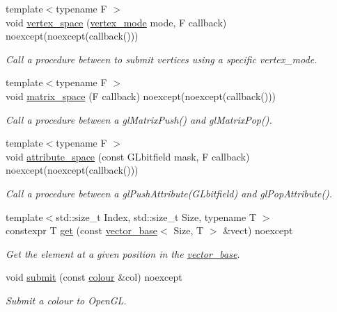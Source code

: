 \begin{DoxyCompactItemize}
{\footnotesize template$<$typename F $>$ }\\void \hyperlink{namespaceglpp_aa7cbd5b1825d6cd9783bc1004a5f0bde}{vertex\+\_\+space} (\hyperlink{namespaceglpp_a3d4cc897229caf80f6712debc078a265}{vertex\+\_\+mode} mode, F callback) noexcept(noexcept(callback()))
\begin{DoxyCompactList}\small\item\em Call a procedure between to submit vertices using a specific vertex\+\_\+mode. \end{DoxyCompactList}\item 
{\footnotesize template$<$typename F $>$ }\\void \hyperlink{namespaceglpp_acdf3d209b8a2c4a5eb03cfad10780e5c}{matrix\+\_\+space} (F callback) noexcept(noexcept(callback()))
\begin{DoxyCompactList}\small\item\em Call a procedure between a gl\+Matrix\+Push() and gl\+Matrix\+Pop(). \end{DoxyCompactList}\item 
{\footnotesize template$<$typename F $>$ }\\void \hyperlink{namespaceglpp_a3b83b5181478800d12d42387c2586114}{attribute\+\_\+space} (const G\+Lbitfield mask, F callback) noexcept(noexcept(callback()))
\begin{DoxyCompactList}\small\item\em Call a procedure between a gl\+Push\+Attribute(\+G\+Lbitfield) and gl\+Pop\+Attribute(). \end{DoxyCompactList}\item 
{\footnotesize template$<$std\+::size\+\_\+t Index, std\+::size\+\_\+t Size, typename T $>$ }\\constexpr T \hyperlink{namespaceglpp_a2a2a3cd8cd810b4e2f45173037cd60b9}{get} (const \hyperlink{classglpp_1_1vector__base}{vector\+\_\+base}$<$ Size, T $>$ \&vect) noexcept
\begin{DoxyCompactList}\small\item\em Get the element at a given position in the \hyperlink{classglpp_1_1vector__base}{vector\+\_\+base}. \end{DoxyCompactList}\item 
void \hyperlink{namespaceglpp_a62c5b57a9af9085a6d51a4d928166fcf}{submit} (const \hyperlink{classglpp_1_1colour}{colour} \&col) noexcept
\begin{DoxyCompactList}\small\item\em Submit a colour to Open\+GL. \end{DoxyCompactList}\item 

\end{DoxyCompactItemize}
